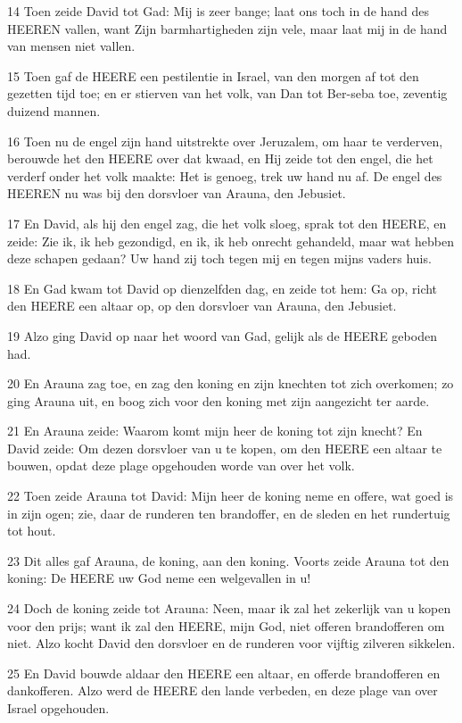\par 14 Toen zeide David tot Gad: Mij is zeer bange; laat ons toch in de hand des HEEREN vallen, want Zijn barmhartigheden zijn vele, maar laat mij in de hand van mensen niet vallen.
\par 15 Toen gaf de HEERE een pestilentie in Israel, van den morgen af tot den gezetten tijd toe; en er stierven van het volk, van Dan tot Ber-seba toe, zeventig duizend mannen.
\par 16 Toen nu de engel zijn hand uitstrekte over Jeruzalem, om haar te verderven, berouwde het den HEERE over dat kwaad, en Hij zeide tot den engel, die het verderf onder het volk maakte: Het is genoeg, trek uw hand nu af. De engel des HEEREN nu was bij den dorsvloer van Arauna, den Jebusiet.
\par 17 En David, als hij den engel zag, die het volk sloeg, sprak tot den HEERE, en zeide: Zie ik, ik heb gezondigd, en ik, ik heb onrecht gehandeld, maar wat hebben deze schapen gedaan? Uw hand zij toch tegen mij en tegen mijns vaders huis.
\par 18 En Gad kwam tot David op dienzelfden dag, en zeide tot hem: Ga op, richt den HEERE een altaar op, op den dorsvloer van Arauna, den Jebusiet.
\par 19 Alzo ging David op naar het woord van Gad, gelijk als de HEERE geboden had.
\par 20 En Arauna zag toe, en zag den koning en zijn knechten tot zich overkomen; zo ging Arauna uit, en boog zich voor den koning met zijn aangezicht ter aarde.
\par 21 En Arauna zeide: Waarom komt mijn heer de koning tot zijn knecht? En David zeide: Om dezen dorsvloer van u te kopen, om den HEERE een altaar te bouwen, opdat deze plage opgehouden worde van over het volk.
\par 22 Toen zeide Arauna tot David: Mijn heer de koning neme en offere, wat goed is in zijn ogen; zie, daar de runderen ten brandoffer, en de sleden en het rundertuig tot hout.
\par 23 Dit alles gaf Arauna, de koning, aan den koning. Voorts zeide Arauna tot den koning: De HEERE uw God neme een welgevallen in u!
\par 24 Doch de koning zeide tot Arauna: Neen, maar ik zal het zekerlijk van u kopen voor den prijs; want ik zal den HEERE, mijn God, niet offeren brandofferen om niet. Alzo kocht David den dorsvloer en de runderen voor vijftig zilveren sikkelen.
\par 25 En David bouwde aldaar den HEERE een altaar, en offerde brandofferen en dankofferen. Alzo werd de HEERE den lande verbeden, en deze plage van over Israel opgehouden.




